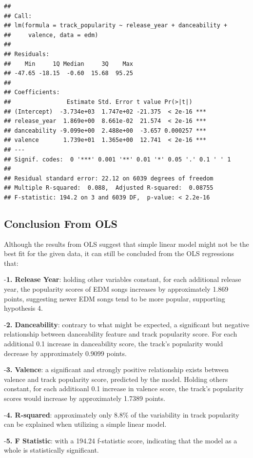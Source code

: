 \documentclass[
]{book}
\begin{document}
\begin{verbatim}
## 
## Call:
## lm(formula = track_popularity ~ release_year + danceability + 
##     valence, data = edm)
## 
## Residuals:
##    Min     1Q Median     3Q    Max 
## -47.65 -18.15  -0.60  15.68  95.25 
## 
## Coefficients:
##                Estimate Std. Error t value Pr(>|t|)    
## (Intercept)  -3.734e+03  1.747e+02 -21.375  < 2e-16 ***
## release_year  1.869e+00  8.661e-02  21.574  < 2e-16 ***
## danceability -9.099e+00  2.488e+00  -3.657 0.000257 ***
## valence       1.739e+01  1.365e+00  12.741  < 2e-16 ***
## ---
## Signif. codes:  0 '***' 0.001 '**' 0.01 '*' 0.05 '.' 0.1 ' ' 1
## 
## Residual standard error: 22.12 on 6039 degrees of freedom
## Multiple R-squared:  0.088,  Adjusted R-squared:  0.08755 
## F-statistic: 194.2 on 3 and 6039 DF,  p-value: < 2.2e-16
\end{verbatim}

\hypertarget{conclusion-from-ols}{%
\subsection{Conclusion From OLS}\label{conclusion-from-ols}}

Although the results from OLS suggest that simple linear model might not be the best fit for the given data, it can still be concluded from the OLS regressions that:

-\textbf{1. Release Year}: holding other variables constant, for each additional release year, the popularity scores of EDM songs increases by approximately 1.869 points, suggesting newer EDM songs tend to be more popular, supporting hypothesis 4.

-\textbf{2. Danceability}: contrary to what might be expected, a significant but negative relationship between danceability feature and track popularity score. For each additional 0.1 increase in danceability score, the track's popularity would decrease by approximately 0.9099 points.

-\textbf{3. Valence}: a significant and strongly positive relationship exists between valence and track popularity score, predicted by the model. Holding others constant, for each additioanl 0.1 increase in valence score, the track's popularity scores would increase by approximately 1.7389 points.

-\textbf{4. R-squared}: approximately only 8.8\% of the variability in track popularity can be explained when utilizing a simple linear model.

-\textbf{5. F Statistic}: with a 194.24 f-statistic score, indicating that the model as a whole is statistically significant.
\end{document}
